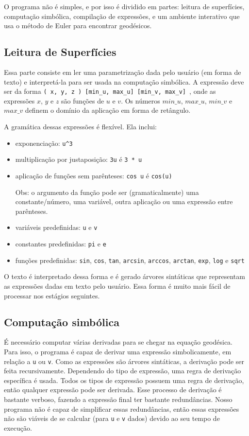 \documentclass{article}
\begin{document}
O programa não é simples, e por isso é dividido em partes: leitura de superfícies, computação simbólica, compilação de expressões, e um ambiente interativo que usa o método de Euler para encontrar geodésicos.

\subsection{Leitura de Superfícies}
Essa parte consiste em ler uma parametrização dada pelo usuário (em forma de texto) e interpretá-la para ser usada na computação simbólica. A expressão deve ser da forma \texttt{( x, y, z ) [min\_u, max\_u] [min\_v, max\_v] }, onde as expressões $x$, $y$ e $z$ são funções de $u$ e $v$. Os números $min\_u$, $max\_u$, $min\_v$ e $max\_v$ definem o domínio da aplicação em forma de retângulo.

A gramática dessas expressões é flexível. Ela inclui:
\begin{itemize}
    \item exponenciação: \texttt{u\textasciicircum 3}
    \item multiplicação por justaposição: \texttt{3u} é \texttt{3 * u}
    \item aplicação de funções sem parênteses: \texttt{cos u} é \texttt{cos(u)}
    
    Obs: o argumento da função pode ser (gramaticalmente) uma constante/número, uma variável, outra aplicação ou uma expressão entre parênteses.
    
    \item variáveis predefinidas: \texttt{u} e \texttt{v}
    \item constantes predefinidas: \texttt{pi} e \texttt{e}
    \item funções predefinidas: \texttt{sin}, \texttt{cos}, \texttt{tan}, \texttt{arcsin}, \texttt{arccos}, \texttt{arctan}, \texttt{exp}, \texttt{log} e \texttt{sqrt}
\end{itemize}

O texto é interpretado dessa forma e é gerado árvores sintáticas que representam as expressões dadas em texto pelo usuário. Essa forma é muito mais fácil de processar nos estágios seguintes.

\subsection{Computação simbólica}
É necessário computar várias derivadas para se chegar na equação geodésica. Para isso, o programa é capaz de derivar uma expressão simbolicamente, em relação a \texttt{u} ou \texttt{v}. Como as expressões são árvores sintáticas, a derivação pode ser feita recursivamente. Dependendo do tipo de expressão, uma regra de derivação específica é usada. Todos os tipos de expressão possuem uma regra de derivação, então qualquer expressão pode ser derivada. Esse processo de derivação é bastante verboso, fazendo a expressão final ter bastante redundâncias. Nosso programa não é capaz de simplificar essas redundâncias, então essas expressões não são viáveis de se calcular (para \texttt{u} e \texttt{v} dados) devido ao seu tempo de execução.
\end{document}
